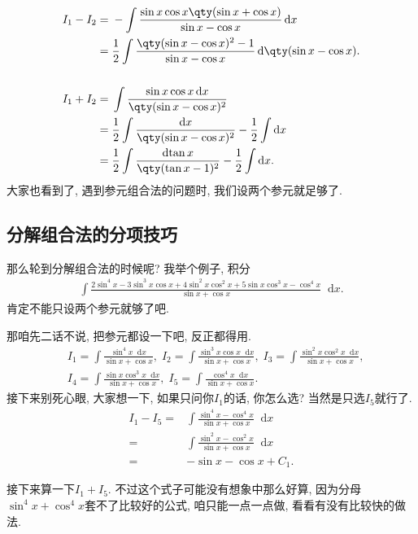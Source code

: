 \documentclass{ctexbook}
\newcommand*{\dif}{\mathop{}\!\mathrm{d}}
\begin{document}
{\begin{align*}
I_{1}-I_{2}={}&-\int\frac{\sin{x}\cos{x}\qty(\sin{x}+\cos{x})}{\sin{x}-\cos{x}}\dif{x}\\
={}&\frac{1}{2}\int\frac{\qty(\sin{x}-\cos{x})^{2}-1}{\sin{x}-\cos{x}}\dif{\qty(\sin{x}-\cos{x})}.\\
\\
I_{1}+I_{2}={}&\int\frac{\sin{x}\cos{x}\dif{x}}{\qty(\sin{x}-\cos{x})^{2}}\\
={}&\frac{1}{2}\int\frac{\dif{x}}{\qty(\sin{x}-\cos{x})^{2}}-\frac{1}{2}\int\dif{x}\\
={}&\frac{1}{2}\int\frac{\dif{\tan{x}}}{\qty(\tan{x}-1)^{2}}-\frac{1}{2}\int\dif{x}
.\end{align*}
大家也看到了, 遇到参元组合法的问题时, 我们设两个参元就足够了. \par
\subsection{分解组合法的分项技巧}
那么轮到分解组合法的时候呢? 我举个例子, 积分
\begin{align*}
\int\frac{2\sin^{4}{x}-3\sin^{3}{x}\cos{x}+4\sin^{2}{x}\cos^{2}{x}+5\sin{x}\cos^{3}{x}-\cos^{4}{x}}{\sin{x}+\cos{x}}\dif{x}
.\end{align*}
肯定不能只设两个参元就够了吧. \par
那咱先二话不说, 把参元都设一下吧, 反正都得用. 
\begin{align*}
{}&I_{1}=\int\frac{\sin^{4}{x}\dif{x}}{\sin{x}+\cos{x}},\;I_{2}=\int\frac{\sin^{3}{x}\cos{x}\dif{x}}{\sin{x}+\cos{x}},\;I_{3}=\int\frac{\sin^{2}{x}\cos^{2}{x}\dif{x}}{\sin{x}+\cos{x}},\\
{}&I_{4}=\int\frac{\sin{x}\cos^{3}{x}\dif{x}}{\sin{x}+\cos{x}},\;I_{5}=\int\frac{\cos^{4}{x}\dif{x}}{\sin{x}+\cos{x}}
.\end{align*}
接下来别死心眼, 大家想一下, 如果只问你$I_{1}$的话, 你怎么选? 当然是只选$I_{5}$就行了. 
\begin{align*}
I_{1}-I_{5}={}&\int\frac{\sin^{4}{x}-\cos^{4}{x}}{\sin{x}+\cos{x}}\dif{x}\\
={}&\int\frac{\sin^{2}{x}-\cos^{2}{x}}{\sin{x}+\cos{x}}\dif{x}\\
={}&-\sin{x}-\cos{x}+C_{1}
.\end{align*}\par
接下来算一下$I_{1}+I_{5}$. 不过这个式子可能没有想象中那么好算, 因为分母$\sin^{4}{x}+\cos^{4}{x}$套不了比较好的公式, 咱只能一点一点做, 看看有没有比较快的做法. 
\begin{align*}

\end{align*}}
\end{document}
